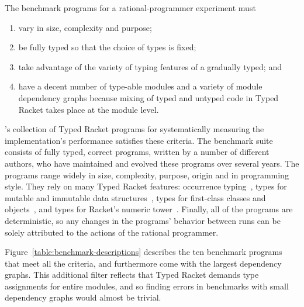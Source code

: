 
The benchmark programs for a rational-programmer experiment must 
\begin{enumerate}
   
\item vary in size, complexity and purpose;

\item be fully typed so that the choice of types is fixed; 
    
\item take advantage of the variety of typing features of a gradually
typed; and

\item have a decent number of type-able modules and a variety of module dependency graphs
 because mixing of typed and untyped code in Typed Racket takes place at the
 module level. 

\end{enumerate}

\citet{gtnffvf-jfp-2019}'s collection of Typed Racket programs for
systematically measuring the implementation's performance satisfies these
criteria. The benchmark suite consists of fully typed, correct programs, written
by a number of different authors, who have maintained and evolved these programs
over several years. The programs range widely in size, complexity, purpose,
origin and in programming style. They rely on many Typed Racket features:
occurrence typing~\citep{tf-icfp-2010}, types for mutable and immutable data
structures~\citep{hpst-sfp-2010}, types for first-class classes and
objects~\citep{tsdtf-oopsla-2012}, and types for Racket's numeric
tower~\citep{stathff-padl-12}.  Finally, all of the programs are deterministic,
so any changes in the programs' behavior between runs can be solely attributed
to the actions of the rational programmer.

Figure~\ref{table:benchmark-descriptions} describes the ten benchmark programs that
meet all the criteria, and furthermore come with the largest dependency graphs.
This additional filter reflects that Typed Racket demands type assignments
for entire modules, and so finding errors in benchmarks with small dependency graphs
would almost be trivial.
